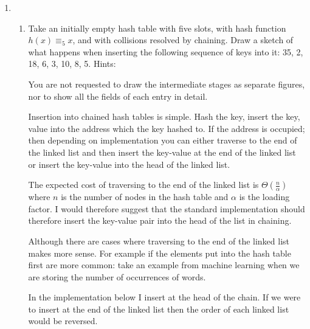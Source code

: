 \documentclass[10pt,\jkfside,a4paper]{article}
\begin{document}
\begin{enumerate}

\item 

\begin{enumerate}

\item Take an initially empty hash table with five slots, with hash function $h(x) \equiv_5 x$, 
and with collisions resolved by chaining. Draw a sketch of what happens when inserting the 
following sequence of keys into it: 35, 2, 18, 6, 3, 10, 8, 5.
Hints:

You are not requested to draw the intermediate stages as separate figures, nor to show all the 
fields of each entry in detail.

Insertion into chained hash tables is simple. Hash the key, insert the key, value into the 
address which the key hashed to. If the address is occupied; then depending on implementation 
you can either traverse to the end of the linked list and then insert the key-value at the end 
of the linked list or insert the key-value into the head of the linked list. 

The expected cost of traversing to the end of the linked list is $\Theta\left(\frac{n}{\alpha}\right)$ 
where $n$ is the number of nodes in the hash table and $\alpha$ is the loading factor. I would therefore 
suggest that the standard implementation should therefore insert the key-value pair into the head of the 
list in chaining. 

Although there are cases where traversing to the end of the linked list makes more sense. For example if 
the elements put into the hash table first are more common: 
take an example from machine learning when we are storing the number of occurrences of words.

In the implementation below I insert at the head of the chain. If we were to insert at the end of the 
linked list then the order of each linked list would be reversed.


\end{enumerate}
\end{enumerate}
\end{document}
